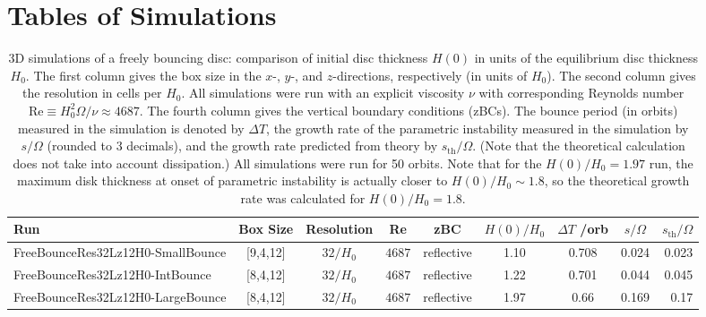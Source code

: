 \documentclass[fleqn,usenatbib]{mnras}
\begin{document}
\section{Tables of Simulations}
\label{APPENDIX_TablesOfSimulations}


\begin{table}
\centering
\caption{3D simulations of a freely bouncing disc: comparison of initial disc thickness $H(0)$ in units of the equilibrium disc thickness $H_0$. The first column gives the box size in the $x$-, $y$-, and $z$-directions, respectively (in units of $H_0$). The second column gives the resolution in cells per $H_0$. All simulations were run with an explicit viscosity $\nu$ with corresponding Reynolds number $\text{Re}\equiv H_0^2 \Omega / \nu \approx 4687$. The fourth column gives the vertical boundary conditions (zBCs). The bounce period (in orbits) measured in the simulation is denoted by $\Delta T$, the growth rate of the parametric instability measured in the simulation by $s/\Omega$ (rounded to 3 decimals), and the growth rate predicted from theory by $s_{\text{th}}/\Omega$. (Note that the theoretical calculation does not take into account dissipation.) All simulations were run for 50 orbits. Note that for the $H(0)/H_0 = 1.97$ run, the maximum disk thickness at onset of parametric instability is actually closer to $H(0)/H_0 \sim 1.8$, so the theoretical growth rate was calculated for $H(0)/H_0 = 1.8$.}
\label{TABLE_3DSimsFreelyBouncing_ComparisonBounceAmplitude}
 	\begin{tabular}{lcccccccr}
		\hline
		Run	& Box Size & Resolution & Re & zBC & $H(0)/H_0$ & $\Delta T$ /orb & $s/\Omega$& $s_{\text{th}}/\Omega$\\ 
        \hline
        FreeBounceRes32Lz12H0-SmallBounce & [9,4,12] & $32/H_0$ & $4687$ & reflective & 1.10 & 0.708 &  0.024 & 0.023\\
        FreeBounceRes32Lz12H0-IntBounce & [8,4,12] & $32/H_0$ & $4687$ & reflective & 1.22 & 0.701 &  0.044 & 0.045\\
        FreeBounceRes32Lz12H0-LargeBounce & [8,4,12] & $32/H_0$ & $4687$ & reflective & 1.97 & 0.66 & 0.169 & 0.17\\
        \hline
	\end{tabular}
\end{table}
\end{document}
